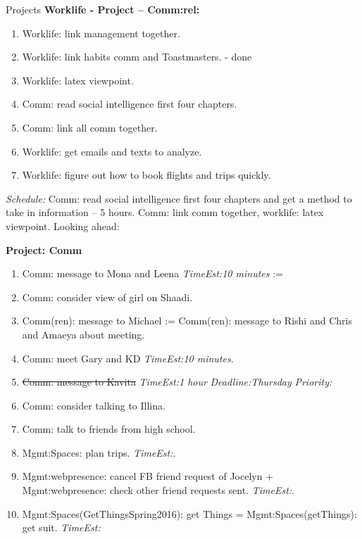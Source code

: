 \documentclass[serif, mathserif, final]{beamer}
\newcommand{\doneTask}[1]{\tiny \item \tiny \sout{#1}}
\newcommand{\te}[1]{\textit{TimeEst:}\textit{#1}}
\newcommand{\dl}[1]{\textit{Deadline:}\textit{#1}}
\newcommand{\pr}[1]{\textit{Priority:}\textit{#1}}
\newcommand{\comments}[1]{}
\begin{document}
\begin{frame}
\begin{columns}
\begin{block}{Projects}
{\bf Worklife - Project – Comm:rel: } 
\begin{enumerate} 
\tiny \item \tiny Worklife: link management together.  
\item \tiny Worklife: link habits comm and Toastmasters. - done
\item \tiny Worklife: latex viewpoint. 
\item \tiny Comm: read social intelligence first four chapters.
\item \tiny Comm: link all comm together.
\item \tiny Worklife: get emails and texts to analyze. 
\item \tiny Worklife: figure out how to book flights and trips quickly. 
\end{enumerate}
\textit{Schedule:} Comm: read social intelligence first four chapters
and get a method to take in information – 5 hours. 
Comm: link comm together, worklife: latex viewpoint. Looking ahead:  


\comments{
{\bf Project: GenKnowledge:}\\
House of cards:
Mgmt:Spaces:
1. Cars.  Work:rel: -  Project – Comm: rel: 
2. 

} 



{\bf Project: Comm} 
\begin{enumerate} 
\tiny \item \tiny Comm: message to Mona and Leena \te{10 minutes}  := 
\item \tiny Comm: consider view of girl on Shaadi. 
\item \tiny Comm(ren): message to Michael :=  Comm(ren): message to
  Rishi and Chris and Amaeya about meeting. 
\item \tiny Comm: meet Gary and KD \te{10 minutes}.  
\doneTask{Comm: message to Kavita}  \te{1 hour} \dl{Thursday} \pr{} 

      \item \tiny Comm: consider talking to Illina.
      \item \tiny Comm: talk to friends from high school.
      \item \tiny Mgmt:Spaces: plan trips. \te{}.

      \item \tiny Mgmt:webpresence: cancel FB friend request of
        Jocelyn + Mgmt:webpresence: check other friend requests
        sent. \te{}.

      \item \tiny Mgmt:Spaces(GetThingsSpring2016): get Things =
        Mgmt:Spaces(getThings): get suit. \te{}


\end{enumerate}
\end{block}
\end{columns}
\end{frame}
\end{document}
